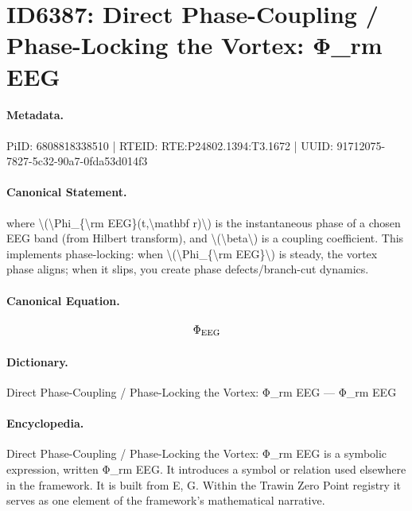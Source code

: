 \section*{ID6387: Direct Phase-Coupling / Phase-Locking the Vortex: Φ\_rm EEG}
\paragraph{Metadata.}
PiID: 6808818338510 | RTEID: RTE:P24802.1394:T3.1672 | UUID: 91712075-7827-5c32-90a7-0fda53d014f3

\paragraph{Canonical Statement.}
where \textbackslash{}(\textbackslash{}Phi\_\{\textbackslash{}rm EEG\}(t,\textbackslash{}mathbf r)\textbackslash{}) is the instantaneous phase of a chosen EEG band (from Hilbert transform), and \textbackslash{}(\textbackslash{}beta\textbackslash{}) is a coupling coefficient. This implements phase-locking: when \textbackslash{}(\textbackslash{}Phi\_\{\textbackslash{}rm EEG\}\textbackslash{}) is steady, the vortex phase aligns; when it slips, you create phase defects/branch-cut dynamics.

\paragraph{Canonical Equation.}
\[
\Phi_{\rm EEG}
\]

\paragraph{Dictionary.}
Direct Phase-Coupling / Phase-Locking the Vortex: Φ\_rm EEG — Φ\_rm EEG

\paragraph{Encyclopedia.}
Direct Phase-Coupling / Phase-Locking the Vortex: Φ\_rm EEG is a symbolic expression, written Φ\_rm EEG. It introduces a symbol or relation used elsewhere in the framework. It is built from E, G. Within the Trawin Zero Point registry it serves as one element of the framework's mathematical narrative.

